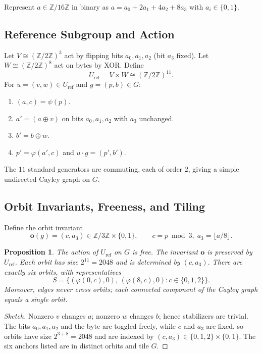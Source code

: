 \documentclass[12pt]{article}
\newtheorem{proposition}[theorem]{Proposition}
\begin{document}
Represent $a\in\mathbb Z/16\mathbb Z$ in binary as $a=a_0+2a_1+4a_2+8a_3$ with $a_i\in\{0,1\}$.

\subsection{Reference Subgroup and Action}
Let $V\cong (\mathbb Z/2\mathbb Z)^3$ act by flipping bits $a_0,a_1,a_2$ (bit $a_3$ fixed). Let $W\cong (\mathbb Z/2\mathbb Z)^8$ act on bytes by XOR. Define
\[
U_{\mathrm{ref}}=V\times W\cong (\mathbb Z/2\mathbb Z)^{11}.
\]
For $u=(v,w)\in U_{\mathrm{ref}}$ and $g=(p,b)\in G$:
\begin{enumerate}\itemsep2pt
  \item $(a,c)=\psi(p)$.
  \item $a' = (a\oplus v)$ on bits $a_0,a_1,a_2$ with $a_3$ unchanged.
  \item $b' = b\oplus w$.
  \item $p' = \varphi(a',c)$ and $u\cdot g=(p',b')$.
\end{enumerate}
The $11$ standard generators are commuting, each of order $2$, giving a simple undirected Cayley graph on $G$.

\subsection{Orbit Invariants, Freeness, and Tiling}
Define the orbit invariant
\[
\mathbf o(g)=(c, a_3)\in \mathbb Z/3\mathbb Z\times\{0,1\},\qquad c=p\bmod 3,\; a_3=\lfloor a/8\rfloor.
\]
\begin{proposition}
The action of $U_{\mathrm{ref}}$ on $G$ is free. The invariant $\mathbf o$ is preserved by $U_{\mathrm{ref}}$. Each orbit has size $2^{11}=2048$ and is determined by $(c,a_3)$. There are exactly six orbits, with representatives
\[
S=\{(\varphi(0,c),0),\, (\varphi(8,c),0): c\in\{0,1,2\}\}.
\]
Moreover, edges never cross orbits; each connected component of the Cayley graph equals a single orbit.
\end{proposition}
\begin{proof}[Sketch]
Nonzero $v$ changes $a$; nonzero $w$ changes $b$; hence stabilizers are trivial. The bits $a_0,a_1,a_2$ and the byte are toggled freely, while $c$ and $a_3$ are fixed, so orbits have size $2^{3+8}=2048$ and are indexed by $(c,a_3)\in\{0,1,2\}\times\{0,1\}$. The six anchors listed are in distinct orbits and tile $G$.
\end{proof}
\end{document}
